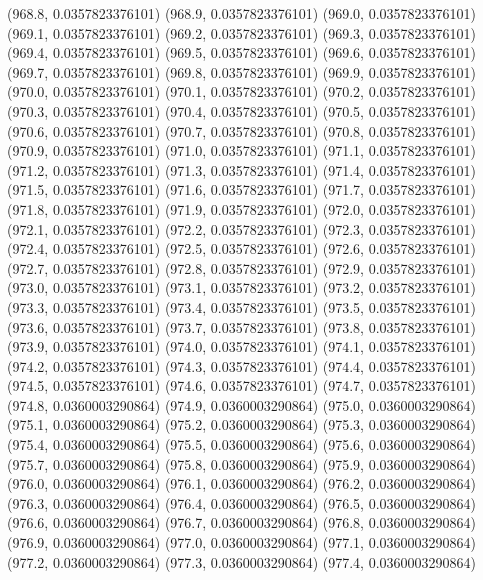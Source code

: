 {					(968.8, 0.0357823376101)
					(968.9, 0.0357823376101)
					(969.0, 0.0357823376101)
					(969.1, 0.0357823376101)
					(969.2, 0.0357823376101)
					(969.3, 0.0357823376101)
					(969.4, 0.0357823376101)
					(969.5, 0.0357823376101)
					(969.6, 0.0357823376101)
					(969.7, 0.0357823376101)
					(969.8, 0.0357823376101)
					(969.9, 0.0357823376101)
					(970.0, 0.0357823376101)
					(970.1, 0.0357823376101)
					(970.2, 0.0357823376101)
					(970.3, 0.0357823376101)
					(970.4, 0.0357823376101)
					(970.5, 0.0357823376101)
					(970.6, 0.0357823376101)
					(970.7, 0.0357823376101)
					(970.8, 0.0357823376101)
					(970.9, 0.0357823376101)
					(971.0, 0.0357823376101)
					(971.1, 0.0357823376101)
					(971.2, 0.0357823376101)
					(971.3, 0.0357823376101)
					(971.4, 0.0357823376101)
					(971.5, 0.0357823376101)
					(971.6, 0.0357823376101)
					(971.7, 0.0357823376101)
					(971.8, 0.0357823376101)
					(971.9, 0.0357823376101)
					(972.0, 0.0357823376101)
					(972.1, 0.0357823376101)
					(972.2, 0.0357823376101)
					(972.3, 0.0357823376101)
					(972.4, 0.0357823376101)
					(972.5, 0.0357823376101)
					(972.6, 0.0357823376101)
					(972.7, 0.0357823376101)
					(972.8, 0.0357823376101)
					(972.9, 0.0357823376101)
					(973.0, 0.0357823376101)
					(973.1, 0.0357823376101)
					(973.2, 0.0357823376101)
					(973.3, 0.0357823376101)
					(973.4, 0.0357823376101)
					(973.5, 0.0357823376101)
					(973.6, 0.0357823376101)
					(973.7, 0.0357823376101)
					(973.8, 0.0357823376101)
					(973.9, 0.0357823376101)
					(974.0, 0.0357823376101)
					(974.1, 0.0357823376101)
					(974.2, 0.0357823376101)
					(974.3, 0.0357823376101)
					(974.4, 0.0357823376101)
					(974.5, 0.0357823376101)
					(974.6, 0.0357823376101)
					(974.7, 0.0357823376101)
					(974.8, 0.0360003290864)
					(974.9, 0.0360003290864)
					(975.0, 0.0360003290864)
					(975.1, 0.0360003290864)
					(975.2, 0.0360003290864)
					(975.3, 0.0360003290864)
					(975.4, 0.0360003290864)
					(975.5, 0.0360003290864)
					(975.6, 0.0360003290864)
					(975.7, 0.0360003290864)
					(975.8, 0.0360003290864)
					(975.9, 0.0360003290864)
					(976.0, 0.0360003290864)
					(976.1, 0.0360003290864)
					(976.2, 0.0360003290864)
					(976.3, 0.0360003290864)
					(976.4, 0.0360003290864)
					(976.5, 0.0360003290864)
					(976.6, 0.0360003290864)
					(976.7, 0.0360003290864)
					(976.8, 0.0360003290864)
					(976.9, 0.0360003290864)
					(977.0, 0.0360003290864)
					(977.1, 0.0360003290864)
					(977.2, 0.0360003290864)
					(977.3, 0.0360003290864)
					(977.4, 0.0360003290864)
}
